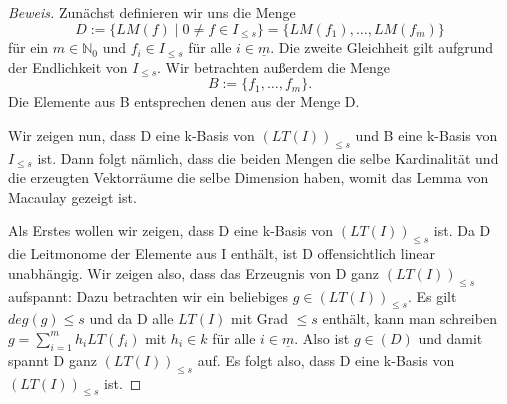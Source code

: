 \documentclass{article}
\newcommand*{\I}{I_{\leq s}}
\begin{document}
	
	\begin{proof}[Beweis]
	Zunächst definieren wir uns die Menge
	\begin{displaymath}
		D := \{LM(f)\; |\; 0 \neq f \in \I\} = \{LM(f_{1}), \ldots, LM(f_{m})\}
	\end{displaymath}
	für ein \(m \in \mathbb{N}_{0}\) und \(f_{i} \in \I\) für alle \(i \in \underline{m}\). Die
	zweite Gleichheit gilt aufgrund der Endlichkeit von \(\I\).
	Wir betrachten außerdem die Menge
	\begin{displaymath} B := \{f_{1}, \ldots, f_{m}\}. \end{displaymath}
	Die Elemente aus B entsprechen denen aus der Menge D.

	Wir zeigen nun, dass D eine k-Basis von \((LT(I))_{\leq s}\) und B eine k-Basis von \(\I\) ist.
	Dann folgt nämlich, dass die beiden Mengen die selbe Kardinalität und die erzeugten
	Vektorräume die selbe Dimension haben, womit das Lemma von Macaulay gezeigt ist.

	Als Erstes wollen wir zeigen, dass D eine k-Basis von \((LT(I))_{\leq s}\) ist. Da D die
	Leitmonome der Elemente aus I enthält, ist D offensichtlich linear unabhängig.
	Wir zeigen also, dass das Erzeugnis von D ganz \((LT(I))_{\leq s}\) aufspannt: Dazu
	betrachten wir ein beliebiges \(g \in (LT(I))_{\leq s}\). Es gilt \(deg(g) \leq s\) und da D
	alle \(LT(I)\) mit Grad \(\leq s\) enthält, kann man schreiben 
	\(g = \sum_{i=1}^{m} h_{i}LT(f_{i})\) mit \(h_{i} \in k\) für alle \(i \in \underline{m}\).
	Also ist \(g \in (D)\) und damit spannt D ganz \((LT(I))_{\leq s}\) auf. Es folgt also, dass
	D eine k-Basis von \((LT(I))_{\leq s}\) ist.
	

\end{proof}
\end{document}
